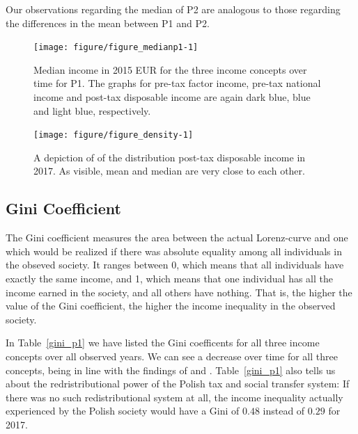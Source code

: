 \documentclass[a4paper]{article}\usepackage[]{graphicx}\usepackage[]{color}
\newenvironment{knitrout}{}{} %
\begin{document}
Our observations regarding the median of P2 are analogous to those regarding the differences in the mean between P1 and P2. 
\begin{knitrout}
\color{fgcolor}\begin{figure}

{\centering \texttt{[image: figure/figure\_medianp1-1]} 

}

\caption[Median income in 2015 EUR for the three income concepts over time for P1]{Median income in 2015 EUR for the three income concepts over time for P1. The graphs for pre-tax factor income, pre-tax national income and post-tax disposable income are again dark blue, blue and light blue, respectively.}\label{fig:figure_medianp1}
\end{figure}


\end{knitrout}
\begin{knitrout}
\color{fgcolor}\begin{figure}

{\centering \texttt{[image: figure/figure\_density-1]} 

}

\caption[A depiction of of the distribution post-tax disposable income in 2017]{A depiction of of the distribution post-tax disposable income in 2017. As visible, mean and median are very close to each other.}\label{fig:figure_density}
\end{figure}


\end{knitrout}

\subsection{Gini Coefficient}
The Gini coefficient measures the area between the actual Lorenz-curve and one which would be realized if there was absolute equality among all individuals in the obseved society. It ranges between 0, which means that all individuals have exactly the same income, and 1, which means that one individual has all the income earned in the society, and all others have nothing. That is, the higher the value of the Gini coefficient, the higher the income inequality in the observed society.

In Table~\ref{gini_p1} we have listed the Gini coefficents for all three income concepts over all observed years. We can see a decrease over time for all three concepts, being in line with the findings of \cite{brzezinski2017} and \cite{Muszynska2018}. Table~\ref{gini_p1} also tells us about the redristributional power of the Polish tax and social transfer system: If there was no such redistributional system at all, the income inequality actually experienced by the Polish society would have a Gini of $0.48$ instead of $0.29$ for 2017.
\end{document}
